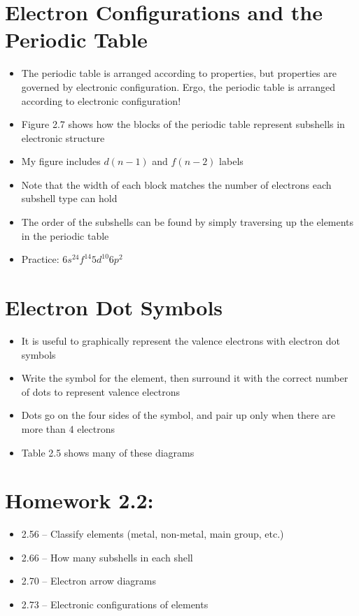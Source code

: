 \documentclass[12pt, openany, letterpaper]{memoir}
\begin{document}
\section{Electron Configurations and the Periodic Table}
\begin{itemize}
	\item The periodic table is arranged according to properties, but properties are governed by electronic configuration. Ergo, the periodic table is arranged according to electronic configuration!
	\item Figure 2.7 shows how the blocks of the periodic table represent subshells in electronic structure
	\item My figure includes $d(n-1)$ and $f(n-2)$ labels
	\item Note that the width of each block matches the number of electrons each subshell type can hold
	\item The order of the subshells can be found by simply traversing up the elements in the periodic table
	\item Practice: $6s^24f^{14}5d^{10}6p^2$
\end{itemize}

\section{Electron Dot Symbols}
\begin{itemize}
	\item It is useful to graphically represent the valence electrons with electron dot symbols
	\item Write the symbol for the element, then surround it with the correct number of dots to represent valence electrons
	\item Dots go on the four sides of the symbol, and pair up only when there are more than 4 electrons
	\item Table 2.5 shows many of these diagrams
\end{itemize}

\section*{Homework 2.2:}
\begin{itemize}
	\item 2.56 -- Classify elements (metal, non-metal, main group, etc.)
	\item 2.66 -- How many subshells in each shell
	\item 2.70 -- Electron arrow diagrams
	\item 2.73 -- Electronic configurations of elements
\end{itemize}
\end{document}
